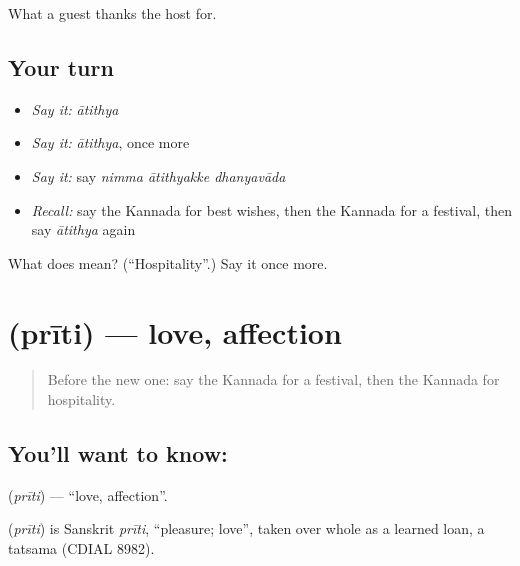 \begin{grammarlens}[title={What you've built}]
What a guest thanks the host for.
\end{grammarlens}

\subsection*{Your turn}
\begin{itemize}
\raggedright
  \item \emph{Say it:} \emph{ātithya}
  \item \emph{Say it:} \emph{ātithya}, once more
  \item \emph{Say it:} say \emph{nimma ātithyakke dhanyavāda}
  \item \emph{Recall:} say the Kannada for best wishes, then the Kannada for a festival, then say \emph{ātithya} again
\end{itemize}

\begin{tcolorbox}[breakable,colback=teal!4,colframe=teal!35!black,title={Before you move on}]
What does  mean? (\textquotedblleft{}Hospitality\textquotedblright{}.) Say it once more.
\end{tcolorbox}
\section[\texorpdfstring{\kn{ಪ್ರೀತಿ} (prīti)}{ಪ್ರೀತಿ (prīti)}]{ (prīti) — love, affection}

\label{lesson:KA-C105-love}



\begin{quote}
Before the new one: say the Kannada for a festival, then the Kannada for hospitality.
\end{quote}

\subsection*{You'll want to know: }
\textbf{} (\emph{prīti}) — \textquotedblleft{}love, affection\textquotedblright{}.

\begin{cousinweb}
\textbf{} (\emph{prīti}) is Sanskrit \emph{prīti}, \textquotedblleft{}pleasure; love\textquotedblright{}, taken over whole as a learned loan, a tatsama (CDIAL 8982).
\end{cousinweb}

